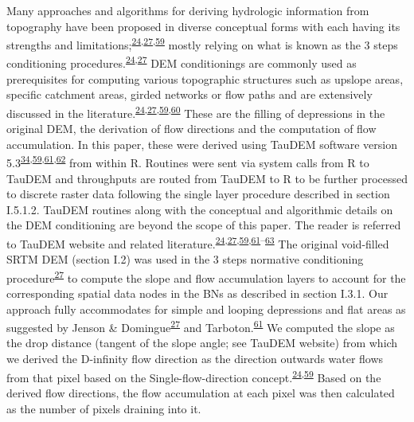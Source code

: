 \documentclass[12pt,oneside]{article}
\begin{document}
Many approaches and algorithms for deriving hydrologic information from
topography have been proposed in diverse conceptual forms with each
having its strengths and
limitations;\textsuperscript{\protect\hyperlink{ref-Arge_et_al_2003}{24},\protect\hyperlink{ref-Jenson_and_Domingue_1988}{27},\protect\hyperlink{ref-Tarboton_1997}{59}}
mostly relying on what is known as the 3 steps conditioning
procedures.\textsuperscript{\protect\hyperlink{ref-Arge_et_al_2003}{24},\protect\hyperlink{ref-Jenson_and_Domingue_1988}{27}}
DEM conditionings are commonly used as prerequisites for computing
various topographic structures such as upslope areas, specific catchment
areas, girded networks or flow paths and are extensively discussed in
the
literature.\textsuperscript{\protect\hyperlink{ref-Arge_et_al_2003}{24},\protect\hyperlink{ref-Jenson_and_Domingue_1988}{27},\protect\hyperlink{ref-Tarboton_1997}{59},\protect\hyperlink{ref-OCallaghan_Mark_1984}{60}}
These are the filling of depressions in the original DEM, the derivation
of flow directions and the computation of flow accumulation. In this
paper, these were derived using TauDEM software version
5.3\textsuperscript{\protect\hyperlink{ref-Yang_et_al_2006}{34},\protect\hyperlink{ref-Tarboton_1997}{59},\protect\hyperlink{ref-Tarboton_et_al_1991}{61},\protect\hyperlink{ref-Tesfa_et_al_2011}{62}}
from within R. Routines were sent via system calls from R to TauDEM and
throughputs are routed from TauDEM to R to be further processed to
discrete raster data following the single layer procedure described in
section I.5.1.2. TauDEM routines along with the conceptual and
algorithmic details on the DEM conditioning are beyond the scope of this
paper. The reader is referred to TauDEM website and related
literature.\textsuperscript{\protect\hyperlink{ref-Arge_et_al_2003}{24},\protect\hyperlink{ref-Jenson_and_Domingue_1988}{27},\protect\hyperlink{ref-Tarboton_1997}{59},\protect\hyperlink{ref-Tarboton_et_al_1991}{61}--\protect\hyperlink{ref-Wallis_et_al_2009}{63}}
The original void-filled SRTM DEM (section I.2) was used in the 3 steps
normative conditioning
procedure\textsuperscript{\protect\hyperlink{ref-Jenson_and_Domingue_1988}{27}}
to compute the slope and flow accumulation layers to account for the
corresponding spatial data nodes in the BNs as described in section
I.3.1. Our approach fully accommodates for simple and looping
depressions and flat areas as suggested by Jenson \&
Domingue\textsuperscript{\protect\hyperlink{ref-Jenson_and_Domingue_1988}{27}}
and
Tarboton.\textsuperscript{\protect\hyperlink{ref-Tarboton_et_al_1991}{61}}
We computed the slope as the drop distance (tangent of the slope angle;
see TauDEM website) from which we derived the D-infinity flow direction
as the direction outwards water flows from that pixel based on the
Single-ﬂow-direction
concept.\textsuperscript{\protect\hyperlink{ref-Arge_et_al_2003}{24},\protect\hyperlink{ref-Tarboton_1997}{59}}
Based on the derived flow directions, the flow accumulation at each
pixel was then calculated as the number of pixels draining into it.
\end{document}
